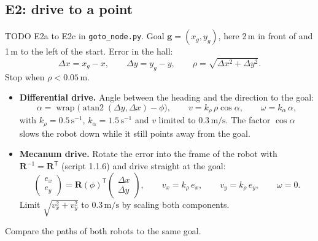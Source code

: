 \documentclass[11pt,a4paper,parskip=half]{scrartcl}
\newcommand{\datei}[1]{\texttt{#1}}
\begin{document}
\subsection*{E2: drive to a point}
TODO E2a to E2c in \datei{goto\_node.py}. Goal \(\mathbf g = (x_g, y_g)\), here 2\,m in front of and
1\,m to the left of the start.
Error in the hall:
\begin{equation}
  \Delta x = x_g - x, \qquad \Delta y = y_g - y, \qquad \rho = \sqrt{\Delta x^2 + \Delta y^2}.
\end{equation}
Stop when \(\rho < 0.05\,\mathrm{m}\).
\begin{itemize}
  \item \textbf{Differential drive.} Angle between the heading and the direction to the goal:
        \begin{equation}
          \alpha = \operatorname{wrap}\!\big(\operatorname{atan2}(\Delta y, \Delta x) - \phi\big), \qquad
          v = k_\rho\,\rho\cos\alpha, \qquad \omega = k_\alpha\,\alpha,
        \end{equation}
        with \(k_\rho = 0.5\,\mathrm{s^{-1}}\), \(k_\alpha = 1.5\,\mathrm{s^{-1}}\) and \(v\) limited to
        \(0.3\,\mathrm{m/s}\). The factor \(\cos\alpha\) slows the robot down while it still points
        away from the goal.
  \item \textbf{Mecanum drive.} Rotate the error into the frame of the robot with
        \(\mathbf R^{-1} = \mathbf R^{\mathsf T}\) (script 1.1.6) and drive straight at the goal:
        \begin{equation}
          \begin{pmatrix} e_x \\ e_y \end{pmatrix} = \mathbf R(\phi)^{\mathsf T}
          \begin{pmatrix} \Delta x \\ \Delta y \end{pmatrix}, \qquad
          v_x = k_\rho\,e_x, \qquad v_y = k_\rho\,e_y, \qquad \omega = 0 .
        \end{equation}
        Limit \(\sqrt{v_x^2 + v_y^2}\) to \(0.3\,\mathrm{m/s}\) by scaling both components.
\end{itemize}
Compare the paths of both robots to the same goal.
\end{document}
